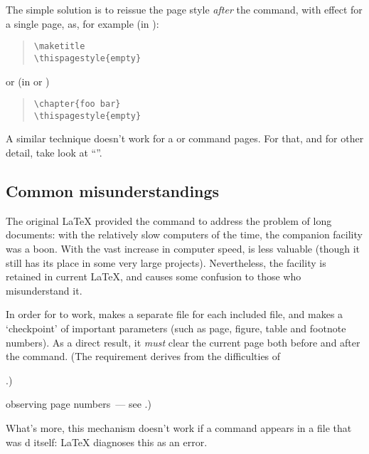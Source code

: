 The simple solution is to reissue the page style \emph{after} the
command, with effect for a single page, as, for example (in
):
\begin{quote}
\begin{verbatim}
\maketitle
\thispagestyle{empty}
\end{verbatim}
\end{quote}
or (in  or )
\begin{quote}
\begin{verbatim}
\chapter{foo bar}
\thispagestyle{empty}
\end{verbatim}
\end{quote}
A similar technique doesn't work for a  or 
 command pages.  For that, and for other detail, take look
at ``''.

\subsection{Common misunderstandings}


The original \LaTeX{} provided the  command to address the
problem of long documents: with the relatively slow computers of the
time, the companion  facility was a boon.  With the
vast increase in computer speed,  is less valuable
(though it still has its place in some very large projects).
Nevertheless, the facility is retained in current \LaTeX{}, and causes
some confusion to those who misunderstand it.

In order for  to work,  makes a separate
 file for each included file, and makes a `checkpoint' of
important parameters (such as page, figure, table and footnote
numbers).  As a direct result, it \emph{must} clear the current page
both before and after the  command.  (The requirement
derives from the difficulties of %
\begin{hyperversion}
  .)
\end{hyperversion}
\begin{flatversion}
  observing page numbers~--- see .)
\end{flatversion}
What's more, this mechanism doesn't work if a  command
appears in a file that was d itself: \LaTeX{} diagnoses
this as an error.

